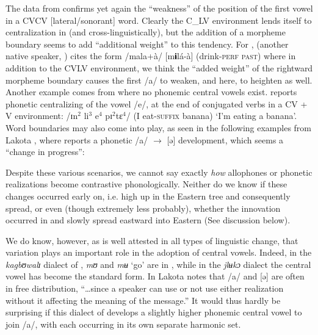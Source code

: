 \documentclass[output=paper,newtxmath,modfonts,nonflat,draft]{langsci/langscibook}
\begin{document}
The data from  confirms yet again the “weakness” of the position of the first vowel in a CVCV [lateral/sonorant] word. Clearly the C\_LV environment lends itself to centralization in  (and cross-linguistically), but the addition of a morpheme boundary seems to add “additional weight” to this tendency. For , \citeauthor{Kokora1976} (another native speaker, \citeyear[39]{Kokora1976}) cites the form /mala+à/ [m\textbf{ɨ}lá-à] (drink-\textsc{perf} \textsc{past}) where in addition to the CVLV environment, we think the “added weight” of the rightward morpheme boundary causes the first /a/ to weaken, and here, to heighten as well. Another example comes from { where no phonemic central vowels exist.} \citet[50]{Bentinck1978} reports phonetic centralizing of the vowel /e/, at the end of conjugated verbs in a CV + V environment:  /ɪn$^2$  li$^3$ e$^4$ pɪ$^2$tɛ$^4$/ (I eat-\textsc{suffix} banana) ‘I’m eating a banana’.  Word boundaries may also come into play, as seen in the following examples from Lakota , where \citet[47]{Guehoun1993} reports a phonetic /a/ $\rightarrow$ [ə] development, which seems a “change in progress”: 

\begin{table}
\caption{Lakota Dida} 
\label{tab:zogbo:23}
\end{table}

Despite these various scenarios, we cannot say exactly \textit{how} allophones or phonetic realizations become contrastive phonologically.  Neither do we know if these changes occurred early on, i.e. high up in the Eastern  tree and consequently spread, or even (though extremely less probably), whether the innovation occurred in  and slowly spread eastward into Eastern  (See discussion below). 

We do know, however, as is well attested in all types of linguistic change, that variation plays an important role in the adoption of central vowels. Indeed, in the \textit{kagbʊwalɪ} dialect of , \textit{mʊ} and \textit{mʉ} ‘go’ are in , while in the \textit{jlʉkɔ} dialect the central vowel has become the standard form. In Lakota  \citet[48]{Guehoun1993} notes that /a/ and [ə] are often in free distribution, “…since a speaker can use or not use either realization without it affecting the meaning of the message.”  It would thus hardly be surprising if this dialect of  develops a slightly higher phonemic central vowel to join /a/, with each occurring in its own separate harmonic set.      
\end{document}
